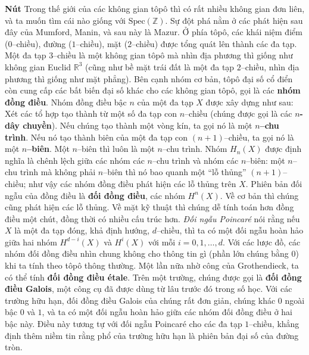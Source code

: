 \begin{multicols}{2}
	\vskip 0.1cm
	\textbf{\color{duongvaotoanhoc}Nút}
	\vskip 0.1cm
	Trong thế giới của các không gian tôpô thì có rất nhiều không gian đơn liên, và ta muốn tìm cái nào giống với $\text{Spec}(\mathbb{Z})$. Sự đột phá nằm ở các phát hiện sau đây của Mumford, Manin, và sau này là Mazur. Ở phía tôpô, các khái niệm điểm ($0$--chiều), đường ($1$--chiều), mặt ($2$--chiều) được tổng quát lên thành các đa tạp. Một đa tạp $3$--chiều là một không gian tôpô mà nhìn địa phương thì giống như không gian Euclid $\mathbb{R}^3$ (cũng như bề mặt trái đất là một đa tạp $2$--chiều, nhìn địa phương thì giống như mặt phẳng).
	\vskip 0.1cm
	Bên cạnh nhóm cơ bản, tôpô đại số cổ điển còn cung cấp các bất biến đại số khác cho các không gian tôpô, gọi là các {\bf\color{duongvaotoanhoc} nhóm đồng điều}. Nhóm đồng điều bậc $n$ của một đa tạp $X$ được xây dựng như sau: Xét các tổ hợp tạo thành từ một số đa tạp con $n$--chiều (chúng được gọi là các {\bf\color{duongvaotoanhoc} $n$-dây chuyền}). Nếu chúng tạo thành một vòng kín, ta gọi nó là một {\bf\color{duongvaotoanhoc} $n$--chu trình}. Nếu nó tạo thành biên của một đa tạp con $(n+1)$--chiều, ta gọi nó là một {\bf\color{duongvaotoanhoc} $n$--biên}. Một $n$--biên thì luôn là một $n$--chu trình. Nhóm $H_n(X)$ được định nghĩa là chênh lệch giữa các nhóm các $n$--chu trình và nhóm các $n$--biên: một $n$--chu trình mà không phải $n$--biên thì nó bao quanh một ``lỗ thủng'' $(n+1)$--chiều; như vậy các nhóm đồng điều phát hiện các lỗ thủng trên $X$. Phiên bản đối ngẫu của đồng điều là {\bf\color{duongvaotoanhoc} đối đồng điều}, các nhóm $H^n(X)$. Về cơ bản thì chúng cũng phát hiện các lỗ thủng. Về mặt kỹ thuật thì chúng dễ tính toán hơn đồng điều một chút, đồng thời có nhiều cấu trúc hơn. {\it Đối ngẫu Poincaré} nói rằng nếu $X$ là một đa tạp đóng, khả định hướng, $d$--chiều, thì ta có một đối ngẫu hoàn hảo giữa hai nhóm $H^{d-i}(X)$ và $H^i(X)$ với mỗi $i = 0,1,\ldots,d$.
	\vskip 0.1cm
	Với các lược đồ, các nhóm đối đồng điều nhìn chung không cho thông tin gì (phần lớn chúng bằng $0$) khi ta tính theo tôpô thông thường. Một lần nữa nhờ công của Grothendieck, ta có thể tính {\bf\color{duongvaotoanhoc}đối đồng điều étale}.  Trên một trường, chúng được gọi là {\bf\color{duongvaotoanhoc}đối đồng điều Galois}, một công cụ đã được dùng từ lâu trước đó trong số học. Với các trường hữu hạn, đối đồng điều Galois của chúng rất đơn giản, chúng khác $0$ ngoài bậc $0$ và $1$, và ta có một đối ngẫu hoàn hảo giữa các nhóm đối đồng điều ở hai bậc này. Điều này tương tự với đối ngẫu Poincaré cho các đa tạp $1$--chiều, khẳng định thêm niềm tin rằng phổ của trường hữu hạn là phiên bản đại số của đường tròn. 

\end{multicols}
